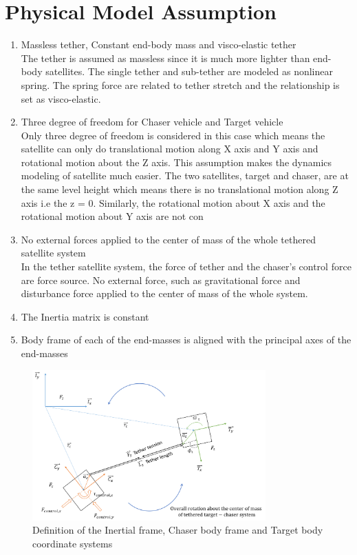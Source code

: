 \section{Physical Model Assumption}

\begin{enumerate}
\label{simu-assumption}
\item Massless tether, Constant end-body mass and visco-elastic tether\\

The tether is assumed as massless since it is much more lighter than end-body satellites.  The single tether and sub-tether are modeled as nonlinear spring. The spring force are related to tether stretch and the relationship is set as visco-elastic.

\item Three degree of freedom for Chaser vehicle and Target vehicle\\

Only three degree of freedom is considered in this case which means the satellite can only do translational motion along X axis and Y axis and rotational motion about the Z axis. This assumption makes the dynamics modeling of satellite much easier. The two satellites, target and chaser, are at the same level height which means there is no translational motion along Z axis i.e the z = 0. Similarly, the rotational motion about X axis and the rotational motion about Y axis are not con
\item No external forces applied to the center of mass of the whole tethered satellite system\\

In the tether satellite system, the force of tether and the chaser's control force are force source. No external force, such as gravitational force and disturbance force applied to the center of mass of the whole system. 
\item The Inertia matrix is constant

\item Body frame of each of the end-masses is aligned with the principal axes of the end-masses
\end{enumerate}

\begin{figure}[ht]
\centering
\includegraphics[width = 0.8\textwidth,right]{fig/simulation/illustration.png}
\caption{Definition of the Inertial frame, Chaser body frame and Target body coordinate systems}
\label{simu-illustration}
\end{figure}



